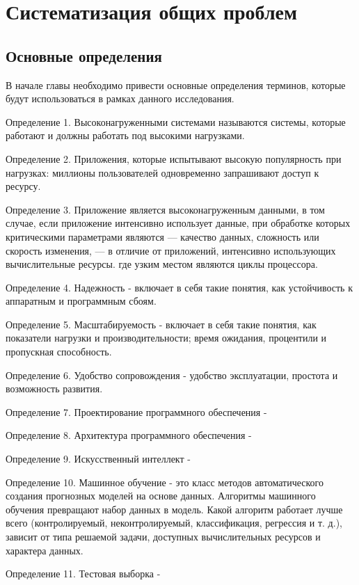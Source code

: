 \chapter{Систематизация общих проблем}\label{ch:ch1}

\section{Основные определения}\label{sec:ch1/sec1}
В начале главы необходимо привести основные определения терминов, которые будут использоваться в рамках данного исследования.

Определение 1. Высоконагруженными системами называются системы, которые работают и должны работать под высокими нагрузками. 

Определение 2. Приложения, которые испытывают высокую популярность при нагрузках: миллионы пользователей одновременно запрашивают доступ к ресурсу.


Определение 3. Приложение является высоконагруженным данными, в том случае, если приложение интенсивно использует данные, при обработке которых критическими параметрами являются — качество данных, сложность или скорость изменения, — в отличие от приложений, интенсивно использующих вычислительные ресурсы.
где узким местом являются циклы процессора.

Определение 4. Надежность - включает в себя такие понятия, как устойчивость к аппаратным и программным сбоям. 

Определение 5. Масштабируемость - включает в себя такие понятия, как показатели нагрузки и производительности; время ожидания, процентили и пропускная способность.

Определение 6. Удобство сопровождения - удобство эксплуатации, простота и возможность развития.

Определение 7. Проектирование программного обеспечения - 

Определение 8. Архитектура программного обеспечения - 

Определение 9. Искусственный интеллект - 

Определение 10. Машинное обучение - это класс методов автоматического создания прогнозных моделей на основе данных. Алгоритмы машинного обучения превращают набор данных в модель. Какой алгоритм работает лучше всего (контролируемый, неконтролируемый, классификация, регрессия и т. д.), зависит от типа решаемой задачи, доступных вычислительных ресурсов и характера данных.

Определение 11. Тестовая выборка - 

